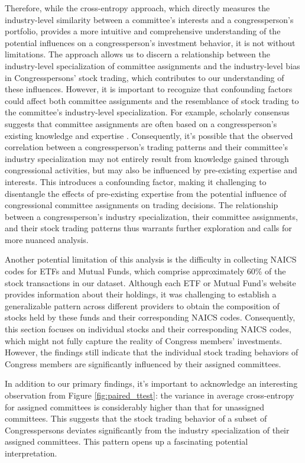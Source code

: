 \documentclass[15pt,letterpaper]{article}
\begin{document}
Therefore, while the cross-entropy approach, which directly measures the industry-level similarity between a committee's interests and a congressperson's portfolio, provides a more intuitive and comprehensive understanding of the potential influences on a congressperson's investment behavior, it is not without limitations. The approach allows us to discern a relationship between the industry-level specialization of committee assignments and the industry-level bias in Congresspersons' stock trading, which contributes to our understanding of these influences. However, it is important to recognize that confounding factors could affect both committee assignments and the resemblance of stock trading to the committee's industry-level specialization.
For example, scholarly consensus suggests that committee assignments are often based on a congressperson's existing knowledge and expertise \citep{10.2307/40709444, 10.2307/2111156, kiewiet1991logic, krehbiel1992information, curry2018knowledge}. Consequently, it's possible that the observed correlation between a congressperson's trading patterns and their committee's industry specialization may not entirely result from knowledge gained through congressional activities, but may also be influenced by pre-existing expertise and interests. This introduces a confounding factor, making it challenging to disentangle the effects of pre-existing expertise from the potential influence of congressional committee assignments on trading decisions. The relationship between a congressperson's industry specialization, their committee assignments, and their stock trading patterns thus warrants further exploration and calls for more nuanced analysis.

Another potential limitation of this analysis is the difficulty in collecting NAICS codes for ETFs and Mutual Funds, which comprise approximately 60\% of the stock transactions in our dataset. Although each ETF or Mutual Fund's website provides information about their holdings, it was challenging to establish a generalizable pattern across different providers to obtain the composition of stocks held by these funds and their corresponding NAICS codes. Consequently, this section focuses on individual stocks and their corresponding NAICS codes, which might not fully capture the reality of Congress members' investments. However, the findings still indicate that the individual stock trading behaviors of Congress members are significantly influenced by their assigned committees.

In addition to our primary findings, it's important to acknowledge an interesting observation from Figure \ref{fig:paired_ttest}: the variance in average cross-entropy for assigned committees is considerably higher than that for unassigned committees. This suggests that the stock trading behavior of a subset of Congresspersons deviates significantly from the industry specialization of their assigned committees. This pattern opens up a fascinating potential interpretation.
\end{document}
